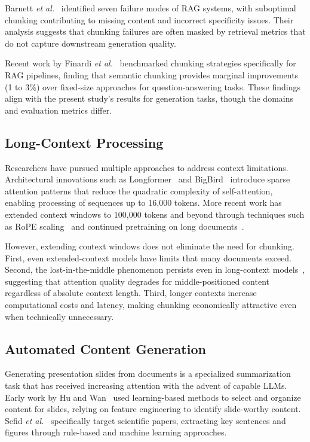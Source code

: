 \documentclass{ieeeaccess}
\begin{document}
Barnett \emph{et al.}~\cite{b13} identified seven failure modes of RAG systems, with suboptimal chunking contributing to missing content and incorrect specificity issues. Their analysis suggests that chunking failures are often masked by retrieval metrics that do not capture downstream generation quality.

Recent work by Finardi \emph{et al.}~\cite{b14} benchmarked chunking strategies specifically for RAG pipelines, finding that semantic chunking provides marginal improvements (1 to 3\%) over fixed-size approaches for question-answering tasks. These findings align with the present study's results for generation tasks, though the domains and evaluation metrics differ.

\subsection{Long-Context Processing}

Researchers have pursued multiple approaches to address context limitations. Architectural innovations such as Longformer~\cite{b15} and BigBird~\cite{b16} introduce sparse attention patterns that reduce the quadratic complexity of self-attention, enabling processing of sequences up to 16,000 tokens. More recent work has extended context windows to 100,000 tokens and beyond through techniques such as RoPE scaling~\cite{b17} and continued pretraining on long documents~\cite{b18}.

However, extending context windows does not eliminate the need for chunking. First, even extended-context models have limits that many documents exceed. Second, the lost-in-the-middle phenomenon persists even in long-context models~\cite{b19}, suggesting that attention quality degrades for middle-positioned content regardless of absolute context length. Third, longer contexts increase computational costs and latency, making chunking economically attractive even when technically unnecessary.

\subsection{Automated Content Generation}

Generating presentation slides from documents is a specialized summarization task that has received increasing attention with the advent of capable LLMs. Early work by Hu and Wan~\cite{b20} used learning-based methods to select and organize content for slides, relying on feature engineering to identify slide-worthy content. Sefid \emph{et al.}~\cite{b21} specifically target scientific papers, extracting key sentences and figures through rule-based and machine learning approaches.
\end{document}
